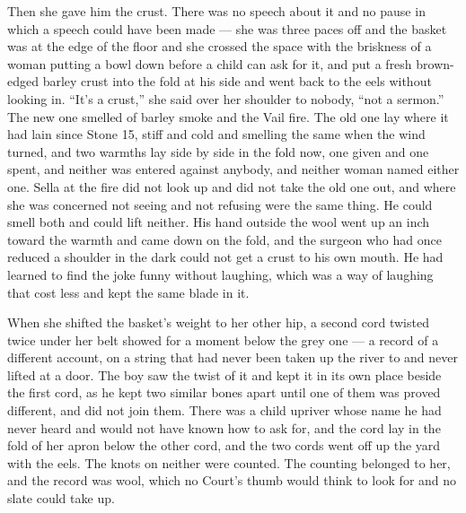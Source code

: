 Then she gave him the crust. There was no speech about it and no pause in which a speech could have been made --- she was three paces off and the basket was at the edge of the floor and she crossed the space with the briskness of a woman putting a bowl down before a child can ask for it, and put a fresh brown-edged barley crust into the fold at his side and went back to the eels without looking in. “It's a crust,” she said over her shoulder to nobody, “not a sermon.” The new one smelled of barley smoke and the Vail fire. The old one lay where it had lain since Stone 15, stiff and cold and smelling the same when the wind turned, and two warmths lay side by side in the fold now, one given and one spent, and neither was entered against anybody, and neither woman named either one. Sella at the fire did not look up and did not take the old one out, and where she was concerned not seeing and not refusing were the same thing. He could smell both and could lift neither. His hand outside the wool went up an inch toward the warmth and came down on the fold, and the surgeon who had once reduced a shoulder in the dark could not get a crust to his own mouth. He had learned to find the joke funny without laughing, which was a way of laughing that cost less and kept the same blade in it.

When she shifted the basket's weight to her other hip, a second cord twisted twice under her belt showed for a moment below the grey one --- a record of a different account, on a string that had never been taken up the river to  and never lifted at a door. The boy saw the twist of it and kept it in its own place beside the first cord, as he kept two similar bones apart until one of them was proved different, and did not join them. There was a child upriver whose name he had never heard and would not have known how to ask for, and the cord lay in the fold of her apron below the other cord, and the two cords went off up the yard with the eels. The knots on neither were counted. The counting belonged to her, and the record was wool, which no Court's thumb would think to look for and no slate could take up.

